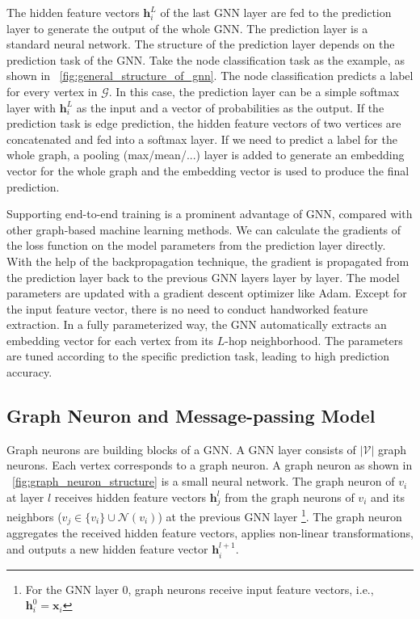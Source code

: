 The hidden feature vectors $\boldsymbol{h}^L_i$ of the last GNN layer are fed to the prediction layer to generate the output of the whole GNN.
The prediction layer is a standard neural network.
The structure of the prediction layer depends on the prediction task of the GNN.
Take the node classification task as the example, as shown in \figurename~\ref{fig:general_structure_of_gnn}.
The node classification predicts a label for every vertex in $\mathcal{G}$.
In this case, the prediction layer can be a simple softmax layer with $\boldsymbol{h}^L_i$ as the input and a vector of probabilities as the output.
If the prediction task is edge prediction, the hidden feature vectors of two vertices are concatenated and fed into a softmax layer.
If we need to predict a label for the whole graph, a pooling (max/mean/...) layer is added to generate an embedding vector for the whole graph and the embedding vector is used to produce the final prediction.

Supporting end-to-end training is a prominent advantage of GNN, compared with other graph-based machine learning methods.
We can calculate the gradients of the loss function on the model parameters from the prediction layer directly.
With the help of the backpropagation technique, the gradient is propagated from the prediction layer back to the previous GNN layers layer by layer.
The model parameters are updated with a gradient descent optimizer like Adam.
Except for the input feature vector, there is no need to conduct handworked feature extraction.
In a fully parameterized way, the GNN automatically extracts an embedding vector for each vertex from its $L$-hop neighborhood.
The parameters are tuned according to the specific prediction task, leading to high prediction accuracy.

\subsection{Graph Neuron and Message-passing Model}

Graph neurons are building blocks of a GNN.
A GNN layer consists of $|\mathcal{V}|$ graph neurons.
Each vertex corresponds to a graph neuron.
A graph neuron as shown in \figurename~\ref{fig:graph_neuron_structure} is a small neural network.
The graph neuron of $v_i$ at layer $l$ receives hidden feature vectors $\boldsymbol{h}^l_j$ from the graph neurons of $v_i$ and its neighbors ($v_j \in \{v_i\} \cup \mathcal{N}(v_i)$) at the previous GNN layer \footnote{For the GNN layer 0, graph neurons receive input feature vectors, i.e., $\boldsymbol{h}^0_i=\boldsymbol{x}_i$}.
The graph neuron aggregates the received hidden feature vectors, applies non-linear transformations, and outputs a new hidden feature vector $\boldsymbol{h}_i^{l+1}$.

